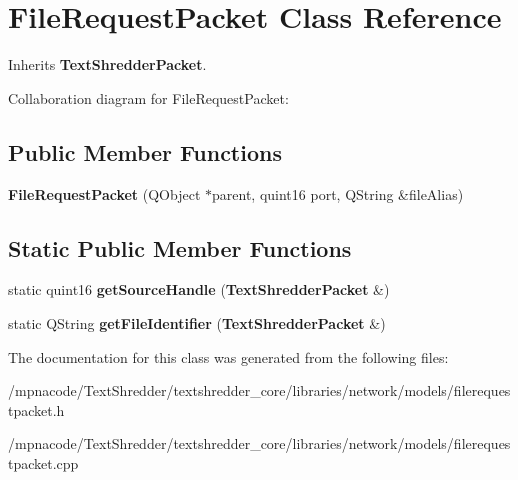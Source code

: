 \section{FileRequestPacket Class Reference}
\label{class_file_request_packet}


Inherits {\bf TextShredderPacket}.



Collaboration diagram for FileRequestPacket:
\subsection*{Public Member Functions}
\begin{DoxyCompactItemize}
\item 
{\bfseries FileRequestPacket} (QObject $\ast$parent, quint16 port, QString \&fileAlias)\label{class_file_request_packet_a53340391be5b6d4d8f849e84b25014e8}

\end{DoxyCompactItemize}
\subsection*{Static Public Member Functions}
\begin{DoxyCompactItemize}
\item 
static quint16 {\bfseries getSourceHandle} ({\bf TextShredderPacket} \&)\label{class_file_request_packet_abcc5c432f601466b1714d4beda837e50}

\item 
static QString {\bfseries getFileIdentifier} ({\bf TextShredderPacket} \&)\label{class_file_request_packet_a0e570788173676d91044b9893a8bc0ce}

\end{DoxyCompactItemize}


The documentation for this class was generated from the following files:\begin{DoxyCompactItemize}
\item 
/mpnacode/TextShredder/textshredder\_\-core/libraries/network/models/filerequestpacket.h\item 
/mpnacode/TextShredder/textshredder\_\-core/libraries/network/models/filerequestpacket.cpp\end{DoxyCompactItemize}
